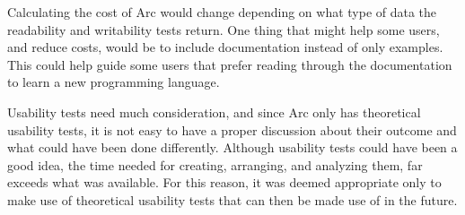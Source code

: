 Calculating the cost of Arc would change depending on what type of data the readability and writability tests return. One thing that might help some users, and reduce costs, would be to include documentation instead of only examples. This could help guide some users that prefer reading through the documentation to learn a new programming language. 

Usability tests need much consideration, and since Arc only has theoretical usability tests, it is not easy to have a proper discussion about their outcome and what could have been done differently. 
Although usability tests could have been a good idea, the time needed for creating, arranging, and analyzing them, far exceeds what was available. For this reason, it was deemed appropriate only to make use of theoretical usability tests that can then be made use of in the future.